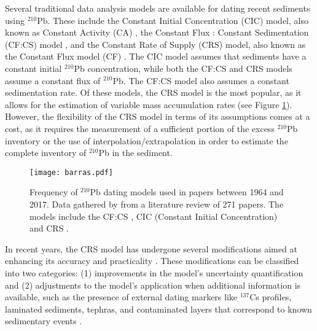 \documentclass [10pt] {article}
\begin{document}
Several traditional data analysis models are available for dating recent sediments using $^{210}$Pb. These include the Constant Initial Concentration (CIC) model, also known as Constant Activity (CA) \citep{Goldberg1963, Robbins1975}, the Constant Flux : Constant Sedimentation (CF:CS) model \citep{Crozaz1964}, and the Constant Rate of Supply (CRS) model, also known as the Constant Flux model (CF) \citep{Appleby1978, Robbins1978, Sanchez-Cabeza2012}. The CIC model assumes that sediments have a constant initial $^{210}$Pb concentration, while both the CF:CS and CRS models assume a constant flux of $^{210}$Pb. The CF:CS model also assumes a constant sedimentation rate. Of these models, the CRS model is the most popular, as it allows for the estimation of variable mass accumulation rates (see Figure \ref{fig:210models}). However, the flexibility of the CRS model in terms of its assumptions comes at a cost, as it requires the measurement of a sufficient portion of the excess $^{210}$Pb inventory or the use of interpolation/extrapolation in order to estimate the complete inventory of $^{210}$Pb in the sediment.



\begin{figure}[h!]
	\begin{centering}
		\texttt{[image: barras.pdf]}
		\caption{Frequency of $^{210}$Pb dating models used in papers between 1964 and 2017. Data gathered by \citet{Courtney2019} from a literature review of 271 papers. The models include the CF:CS \citep[Constant Flux - Constant Sedimentation;][]{Robbins1978}, CIC (Constant Initial Concentration) \citep{Goldberg1963,Crozaz1964,Robbins1978} and CRS  \citep[Constant Rate of Supply;][]{Appleby1978,Robbins1978}. }
		\label{fig:210models}
	\end{centering}
\end{figure}

In recent years, the CRS model has undergone several modifications aimed at enhancing its accuracy and practicality \citep{Binford1990,Appleby2001,Sanchez-Cabeza2014}. These modifications can be classified into two categories: (1) improvements in the model's uncertainty quantification and (2) adjustments to the model's application when additional information is available, such as the presence of external dating markers like $^{137}$Cs profiles, laminated sediments, tephras, and contaminated layers that correspond to known sedimentary events \citep{Appleby1998,Appleby2001,Appleby2008}.
\end{document}
